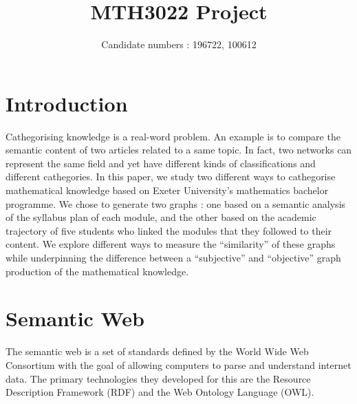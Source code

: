 \documentclass[english, 12pt]{article}
\title{MTH3022 Project}%
\author{Candidate numbers : 196722, 100612}
\date{}
\begin{document}
\maketitle
\section{Introduction}
Cathegorising knowledge is a real-word problem. An example is to compare the semantic content of two articles related to a same topic. In fact, two networks can represent the same field and yet have different kinds of classifications and different cathegories. In this paper, we study two different ways to cathegorise mathematical knowledge based on Exeter University's mathematics bachelor programme. We chose to generate two graphs : one based on a semantic analysis of the syllabus plan of each module, and the other based on the academic trajectory of five students who linked the modules that they followed to their content. We explore different ways to measure the ``similarity'' of these graphs while underpinning the difference between a ``subjective'' and ``objective'' graph production of the mathematical knowledge.

\section{Semantic Web}
The semantic web is a set of standards defined by the World Wide Web Consortium\cite{w3c_website} with the goal of allowing computers to parse and understand internet data. The primary technologies they developed for this are the Resource Description Framework\cite{w3c_rdf} (RDF) and the Web Ontology Language\cite{w3c_owl} (OWL).
\end{document}
